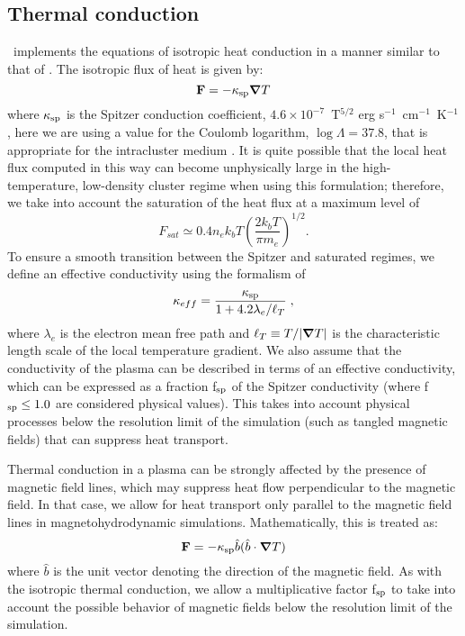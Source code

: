 \subsection{Thermal conduction}
\label{sec.num.conductions}

\enzo\ implements the equations of isotropic heat conduction in a manner
similar to that of \citet{2007ApJ...664..135P}.  
The isotropic flux of heat is given by:
\begin{equation}
\myvec{F} = -\kappa_{\rm sp} \grad T
\end{equation}
where $\kappa_{\rm sp}$ is the Spitzer conduction coefficient, $4.6 \times 10^{-7}$~T$^{5/2}$ erg
s$^{-1}$~cm$^{-1}$~K$^{-1}$ \citep{1962pfig.book.....S}, here we are using a
value for the Coulomb logarithm, $\log \Lambda = 37.8$, that is
appropriate for the intracluster medium \citep{1988xrec.book.....S}.
It is quite possible that the local heat flux computed in this way 
can become unphysically large in
the high-temperature, low-density cluster regime when using this
formulation; therefore, we take into account the saturation of the heat
flux \citep{1977ApJ...211..135C} at a maximum level of
\begin{equation}
F_{sat} \simeq 0.4 n_e k_b T \left( \frac{2 k_b T}{\pi m_e} \right)^{1/2}.
\end{equation}
To ensure a smooth transition between
the Spitzer and saturated regimes, we define an effective
conductivity using the formalism of \citet{1988xrec.book.....S}
\begin{equation}
\kappa_{eff} = \frac{\kappa_{\rm sp}}{1 + 4.2 \lambda_e / \ell_T} \; ,
\end{equation}
where $\lambda_e$ is the electron mean free path and $\ell_T \equiv T
/ |\bm{\nabla} T|$ is the characteristic length scale of the local
temperature gradient.  We also assume that the conductivity of the
plasma can be described in terms of an effective conductivity, which
can be expressed as a fraction f$_{\rm sp}$ of the Spitzer conductivity
(where f$_{\rm sp} \leq 1.0$ are considered physical values).  This takes
into account physical processes below the resolution limit of the
simulation (such as tangled magnetic fields) that can suppress heat
transport.

Thermal conduction in a plasma can be strongly affected by the
presence of magnetic field lines, which may suppress heat
flow perpendicular to the magnetic field.  In that case, we allow for
heat transport only parallel to the magnetic field lines in
magnetohydrodynamic simulations.  Mathematically, this is treated as:
\begin{equation}
\myvec{F} = -\kappa_{\rm sp} \hat{b} (\hat{b} \cdot \grad T)
\end{equation}
where $\hat{b}$ is the unit vector denoting the direction of the
magnetic field.  As with the isotropic thermal conduction, we allow a
multiplicative factor f$_{\rm sp}$ to take into account the possible
behavior of magnetic fields below the resolution limit of the
simulation.

